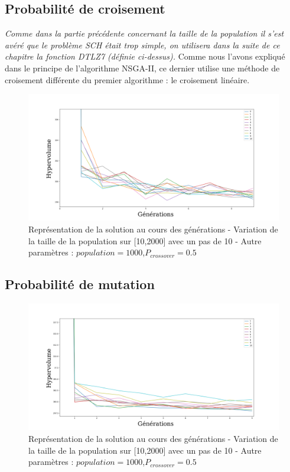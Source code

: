 \documentclass[12pt]{report}
\begin{document}
      \subsection{Probabilité de croisement}
      \emph{Comme dans la partie précédente concernant la taille de la population il s'est avéré que le problème SCH était trop simple, on utilisera dans la suite de ce chapitre la fonction DTLZ7 (définie ci-dessus).}
      Comme nous l'avons expliqué dans le principe de l'algorithme NSGA-II, ce dernier utilise une méthode de croisement différente du premier algorithme : le croisement linéaire.
      \begin{figure}[h]
        \centering
        \includegraphics[width=15cm]{img/DTLZ7_crossover.png}
        \caption{Représentation de la solution au cours des générations - Variation de la taille de la population sur [10,2000] avec un pas de 10 - Autre paramètres : $population = 1000$,$P_{crossover} = 0.5$}
        \label{sch_crossover_moy}
      \end{figure}


      \subsection{Probabilité de mutation}
      \begin{figure}[h]
        \centering
        \includegraphics[width=15cm]{img/DTLZ7_mutation.png}
        \caption{Représentation de la solution au cours des générations - Variation de la taille de la population sur [10,2000] avec un pas de 10 - Autre paramètres : $population = 1000$,$P_{crossover} = 0.5$}
        \label{sch_mutation_moy}
      \end{figure}
\end{document}

